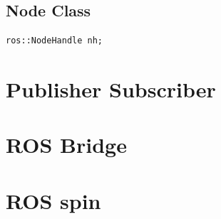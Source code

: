 \documentclass[12pt,a4paper,oneside]{report}
\begin{document}
\section{Node Class}
\begin{lstlisting}
ros::NodeHandle nh;
\end{lstlisting}



\chapter{Publisher Subscriber}

\chapter{ROS Bridge}

\chapter{ROS spin}
\end{document}
